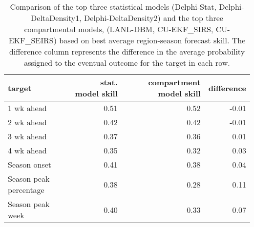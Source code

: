 \begin{table}[ht]
\centering
\begin{tabular}{lrrr}
  \hline
target & stat. model skill & compartment model skill & difference \\ 
  \hline
1 wk ahead & 0.51 & 0.52 & -0.01 \\ 
  2 wk ahead & 0.42 & 0.42 & -0.01 \\ 
  3 wk ahead & 0.37 & 0.36 & 0.01 \\ 
  4 wk ahead & 0.35 & 0.32 & 0.03 \\ 
  Season onset & 0.41 & 0.38 & 0.04 \\ 
  Season peak percentage & 0.38 & 0.28 & 0.11 \\ 
  Season peak week & 0.40 & 0.33 & 0.07 \\ 
   \hline
\end{tabular}
\caption{Comparison of the top three statistical models (Delphi-Stat, Delphi-DeltaDensity1, Delphi-DeltaDensity2) and the top three compartmental models, (LANL-DBM, CU-EKF\_SIRS, CU-EKF\_SEIRS) based on best average region-season forecast skill. The difference column represents the difference in the average probability assigned to the eventual outcome for the target in each row.} 
\label{tab:modeltype-scores}
\end{table}
